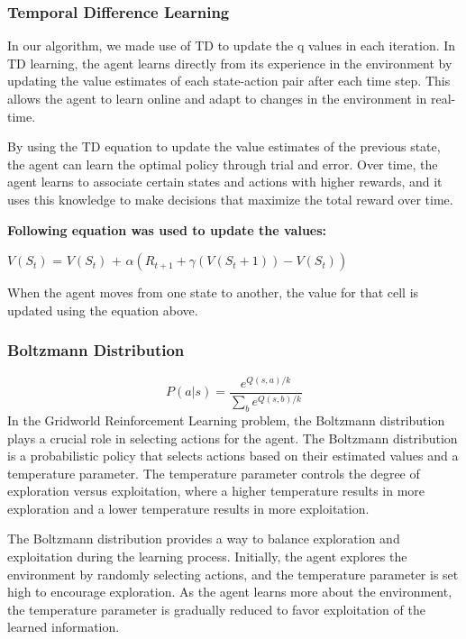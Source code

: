\documentclass{article}
\begin{document}
\subsubsection{Temporal Difference Learning}
In our algorithm, we made use of TD to update the q values in each iteration. In TD learning, the agent learns directly from its experience in the environment by updating the value estimates of each state-action pair after each time step. This allows the agent to learn online and adapt to changes in the environment in real-time.

By using the TD equation to update the value estimates of the previous state, the agent can learn the optimal policy through trial and error. Over time, the agent learns to associate certain states and actions with higher rewards, and it uses this knowledge to make decisions that maximize the total reward over time.

\textbf{Following equation was used to update the values: }

$V(S_{t})$ = $V(S_{t})$ + $\alpha(R_{t+1} + \gamma (V(S_{t}+1))-V(S_{t}))$

When the agent moves from one state to another, the value for that cell is updated using the equation above. 

\subsubsection{Boltzmann Distribution}

\begin{equation}
P(a|s) = \frac{e^{Q(s,a)/k}}{\sum_{b} e^{Q(s,b)/k}}
\end{equation}
In the Gridworld Reinforcement Learning problem, the Boltzmann distribution plays a crucial role in selecting actions for the agent. The Boltzmann distribution is a probabilistic policy that selects actions based on their estimated values and a temperature parameter. The temperature parameter controls the degree of exploration versus exploitation, where a higher temperature results in more exploration and a lower temperature results in more exploitation.

The Boltzmann distribution provides a way to balance exploration and exploitation during the learning process. Initially, the agent explores the environment by randomly selecting actions, and the temperature parameter is set high to encourage exploration. As the agent learns more about the environment, the temperature parameter is gradually reduced to favor exploitation of the learned information.
\end{document}
